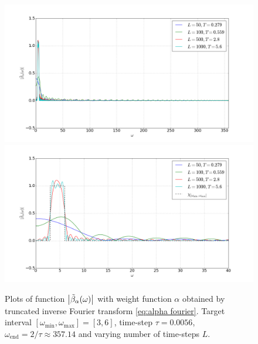 \documentclass[a4paper,11pt,bibliography=totoc,listof=totoc,headinclude=true,cleardoublepage=empty,oneside]{scrbook}
\newcommand{\dff}{\Tilde{\beta}_\alpha}
\newcommand{\e}{\mathrm{end}}
\begin{document}
\begin{figure}
    \centering
    \includegraphics[width=1\linewidth]{latex//images//fourier/Figure_1.png}
    \includegraphics[width=1\linewidth]{latex//images//fourier/Figure_2.png}
    \caption{Plots of function $\left|\dff(\omega) \right|$ with weight function $\alpha$ obtained by truncated inverse Fourier transform \eqref{eq:alpha fourier}. Target interval $\left[\omega_{\min}, \omega_{\max} \right] = [3, 6]$, time-step $\tau = 0.0056$, $\omega_\e = 2/\tau \approx 357.14$ and varying number of time-steps $L$. }
    \label{fig:fourier1}
\end{figure}
\end{document}
